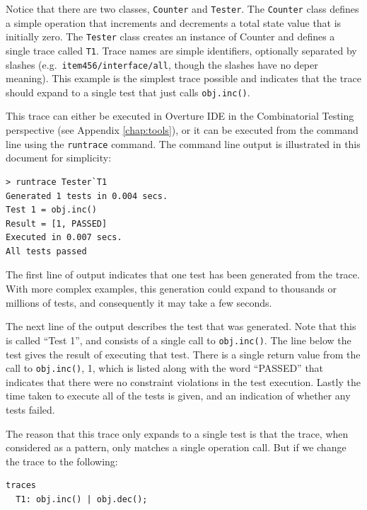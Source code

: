 \documentclass{overturerepchap}
\begin{document}
\noindent Notice that there are two classes, \texttt{Counter} and
\texttt{Tester}. The \texttt{Counter} class defines a simple operation that
increments and decrements a total state value that is initially zero. The
\texttt{Tester} class creates an instance of Counter and defines a single trace
called \texttt{T1}. Trace names are simple identifiers, optionally separated by
slashes (e.g.\ \texttt{item456/interface/all}, though the slashes have no
deper meaning). This example is the simplest trace possible and indicates that
the trace should expand to a single test that just calls \texttt{obj.inc()}.

This trace can either be executed in Overture IDE in the Combinatorial Testing
perspective (see Appendix \ref{chap:tools}), or it can be executed from
the command line using the \texttt{runtrace} command. The command line output is
illustrated in this document for simplicity:

\lstset{style=tool,language=}
\begin{lstlisting}[escapechar=@]
> runtrace Tester`T1
Generated 1 tests in 0.004 secs. 
Test 1 = obj.inc()
Result = [1, PASSED]
Executed in 0.007 secs. 
All tests passed
\end{lstlisting}
\lstset{style=mystyle}
\lstset{language=VDM++}

\noindent The first line of output indicates that one test has been generated from the
trace. With more complex examples, this generation could expand to thousands or
millions of tests, and consequently it may take a few seconds.

The next line of the output describes the test that was generated. Note that
this is called ``Test 1'', and consists of a single call to \texttt{obj.inc()}.
The line below the test gives the result of executing that test. There is a
single return value from the call to \texttt{obj.inc()}, 1, which is listed
along with the word ``PASSED'' that indicates that there were no constraint violations
in the test execution.
Lastly the time taken to execute all of the tests is given, and an indication of
whether any tests failed.

The reason that this trace only expands to a single test is that the trace, when
considered as a pattern, only matches a single operation call. But if we change
the trace to the following:

\small
\begin{lstlisting}
traces
  T1: obj.inc() | obj.dec();
\end{lstlisting}
\normalsize
\end{document}
